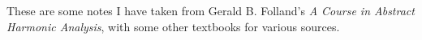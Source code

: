 \documentclass[10pt]{mypackage}
\begin{document}
\RaggedRight
These are some notes I have taken from Gerald B. Folland's \textit{A Course in Abstract Harmonic Analysis}, with some other textbooks for various sources.
\end{document}
